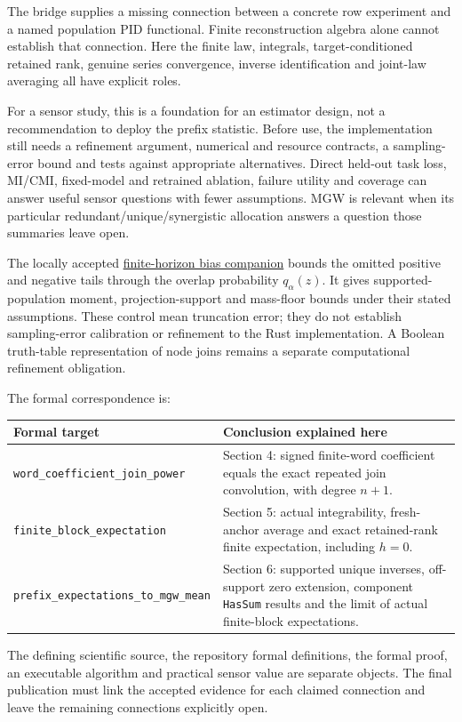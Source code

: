 \label{what-this-adds-and-what-must-come-next}

The bridge supplies a missing connection between a concrete row experiment and a named population PID functional. Finite reconstruction algebra alone cannot establish that connection. Here the finite law, integrals, target-conditioned retained rank, genuine series convergence, inverse identification and joint-law averaging all have explicit roles.

For a sensor study, this is a foundation for an estimator design, not a recommendation to deploy the prefix statistic. Before use, the implementation still needs a refinement argument, numerical and resource contracts, a sampling-error bound and tests against appropriate alternatives. Direct held-out task loss, MI/CMI, fixed-model and retrained ablation, failure utility and coverage can answer useful sensor questions with fewer assumptions. MGW is relevant when its particular redundant/unique/synergistic allocation answers a question those summaries leave open.

The locally accepted \href{https://github.com/sepahead/pid-rs/blob/main/audit/formal/lean-prefix-mgw-bias/EXPOSITION.md}{finite-horizon bias companion} bounds the omitted positive and negative tails through the overlap probability \(q_\alpha(z)\). It gives supported-population moment, projection-support and mass-floor bounds under their stated assumptions. These control mean truncation error; they do not establish sampling-error calibration or refinement to the Rust implementation. A Boolean truth-table representation of node joins remains a separate computational refinement obligation.

The formal correspondence is:

{\def\LTcaptype{none} %
\begin{longtable}[]{@{}
  >{\raggedright\arraybackslash}p{}
  >{\raggedright\arraybackslash}p{}@{}}
\toprule\noalign{}
\begin{minipage}[b]{\linewidth}\raggedright
Formal target
\end{minipage} & \begin{minipage}[b]{\linewidth}\raggedright
Conclusion explained here
\end{minipage} \\
\midrule\noalign{}
\endhead
\bottomrule\noalign{}
\endlastfoot
\texttt{word\_coefficient\_join\_power} & Section 4: signed finite-word coefficient equals the exact repeated join convolution, with degree \(n+1\). \\
\texttt{finite\_block\_expectation} & Section 5: actual integrability, fresh-anchor average and exact retained-rank finite expectation, including \(h=0\). \\
\texttt{prefix\_expectations\_to\_mgw\_mean} & Section 6: supported unique inverses, off-support zero extension, component \texttt{HasSum} results and the limit of actual finite-block expectations. \\
\end{longtable}
}

The defining scientific source, the repository formal definitions, the formal proof, an executable algorithm and practical sensor value are separate objects. The final publication must link the accepted evidence for each claimed connection and leave the remaining connections explicitly open.
